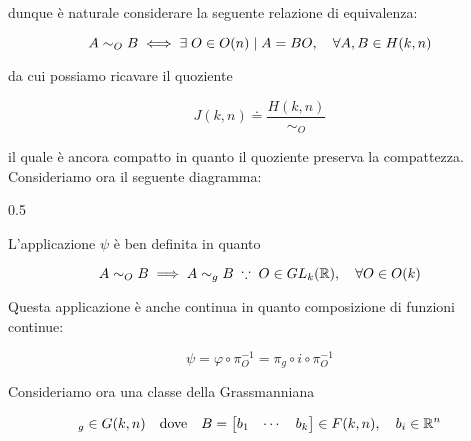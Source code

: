 {dunque è naturale considerare la seguente relazione di equivalenza:

\begin{equation}
	A \sim_{O} B \iff \E O \in O(n) \mid A = B O \qcomma \forall A, B \in H(k,n)
\end{equation}

da cui possiamo ricavare il quoziente

\begin{equation}
	J(k,n) \doteq \dfrac{H(k,n)}{\sim_{O}}
\end{equation}

il quale è ancora compatto in quanto il quoziente preserva la compattezza. \\
Consideriamo ora il seguente diagramma:

	{0.5}{%
			}

L'applicazione $ \psi $ è ben definita in quanto

\begin{equation}
	A \sim_{O} B \implies A \sim_{g} B %
	\; \because \; %
	O \in GL_{k}(\R) \qcomma \forall O \in O(k)
\end{equation}

Questa applicazione è anche continua in quanto composizione di funzioni continue:

\begin{equation}
	\psi = \varphi \circ \pi_{O}^{-1} = \pi_{g} \circ i \circ \pi_{O}^{-1}
\end{equation}

Consideriamo ora una classe della Grassmanniana

\begin{equation}
	[B]_{g} \in G(k,n) \qq{dove} B = \bmqty{ b_{1} & \cdots & b_{k} } \in F(k,n) \qcomma b_{i} \in \R^{n}
\end{equation}

}
